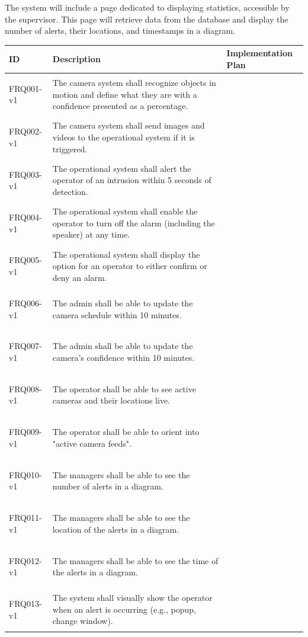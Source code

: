 \documentclass{article}
\begin{document}
The system will include a page dedicated to displaying statistics, accessible by the supervisor. This page will retrieve data from the database and display the number of alerts, their locations, and timestamps in a diagram. 
\clearpage
\begin{table}[h] 
\centering
\begin{tabular}{|l|p{8cm}|p{5cm}|}
\hline
\textbf{ID} & \textbf{Description} & \textbf{Implementation Plan} \\
\hline
\hypertarget{FRQ001}{FRQ001-v1} & The camera system shall recognize objects in motion and define what they are with a confidence presented as a percentage. &  \\
\hline
\hypertarget{FRQ002}{FRQ002-v1} & The camera system shall send images and videos to the operational system if it is triggered. &  \\
\hline
\hypertarget{FRQ003}{FRQ003-v1} & The operational system shall alert the operator of an intrusion within 5 seconds of detection. &  \\
\hline
\hypertarget{FRQ004}{FRQ004-v1} & The operational system shall enable the operator to turn off the alarm (including the speaker) at any time. &  \\
\hline
\hypertarget{FRQ005}{FRQ005-v1} & The operational system shall display the option for an operator to either confirm or deny an alarm. &  \\
\hline
\hypertarget{FRQ006}{FRQ006-v1} & The admin shall be able to update the camera schedule within 10 minutes. &  \\
\hline
\hypertarget{FRQ007}{FRQ007-v1} & The admin shall be able to update the camera’s confidence within 10 minutes. &  \\
\hline
\hypertarget{FRQ008}{FRQ008-v1} & The operator shall be able to see active cameras and their locations live. &  \\
\hline
\hypertarget{FRQ009}{FRQ009-v1} & The operator shall be able to orient into "active camera feeds". &  \\
\hline
\hypertarget{FRQ010}{FRQ010-v1} & The managers shall be able to see the number of alerts in a diagram. &  \\
\hline
\hypertarget{FRQ011}{FRQ011-v1} & The managers shall be able to see the location of the alerts in a diagram. &  \\
\hline
\hypertarget{FRQ012}{FRQ012-v1} & The managers shall be able to see the time of the alerts in a diagram. &  \\
\hline
\hypertarget{FRQ013}{FRQ013-v1} & The system shall visually show the operator when an alert is occurring (e.g., popup, change window). &  \\

\end{tabular}
\end{table}
\end{document}
